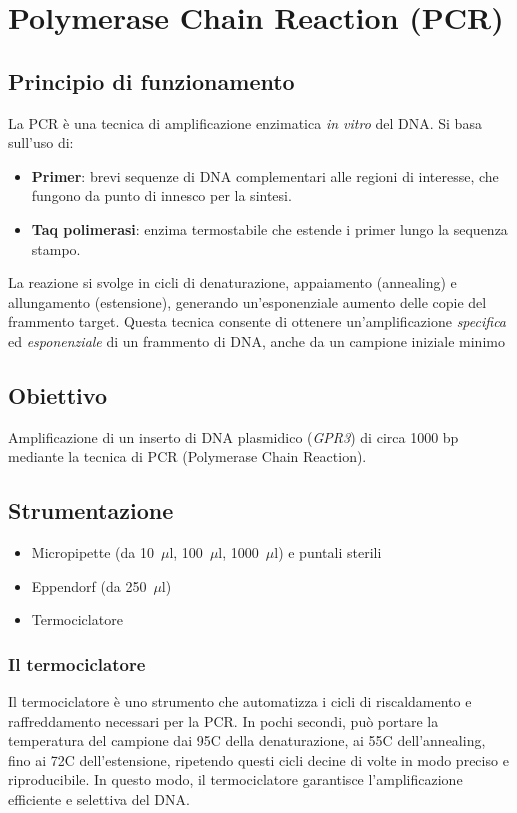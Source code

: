 \section{Polymerase Chain Reaction (PCR)}

\subsection{Principio di funzionamento}
La PCR è una tecnica di amplificazione enzimatica \emph{in vitro} del DNA. Si basa sull’uso di:
\begin{itemize}
    \item \textbf{Primer}: brevi sequenze di DNA complementari alle regioni di interesse, che fungono da punto di innesco per la sintesi.
    \item \textbf{Taq polimerasi}: enzima termostabile che estende i primer lungo la sequenza stampo.
\end{itemize}
La reazione si svolge in cicli di denaturazione, appaiamento (annealing) e allungamento (estensione), generando un’esponenziale aumento delle copie del frammento target.
Questa tecnica consente di ottenere un’amplificazione \emph{specifica} ed \emph{esponenziale} di un frammento di DNA, anche da un campione iniziale minimo

\subsection{Obiettivo}
Amplificazione di un inserto di DNA plasmidico (\emph{GPR3}) di circa 1000 bp mediante la tecnica di PCR (Polymerase Chain Reaction).

\subsection{Strumentazione}
\begin{itemize}
    \item Micropipette (da 10~$\mu$l, 100~$\mu$l, 1000~$\mu$l) e puntali sterili
    \item Eppendorf (da 250~$\mu$l)
    \item Termociclatore
\end{itemize}

\subsubsection{Il termociclatore}
Il termociclatore è uno strumento che automatizza i cicli di riscaldamento e raffreddamento necessari per la PCR. In pochi secondi, può portare la temperatura del campione dai 95\textdegree C della denaturazione, ai 55\textdegree C dell’annealing, fino ai 72\textdegree C dell’estensione, ripetendo questi cicli decine di volte in modo preciso e riproducibile. In questo modo, il termociclatore garantisce l’amplificazione efficiente e selettiva del DNA.

